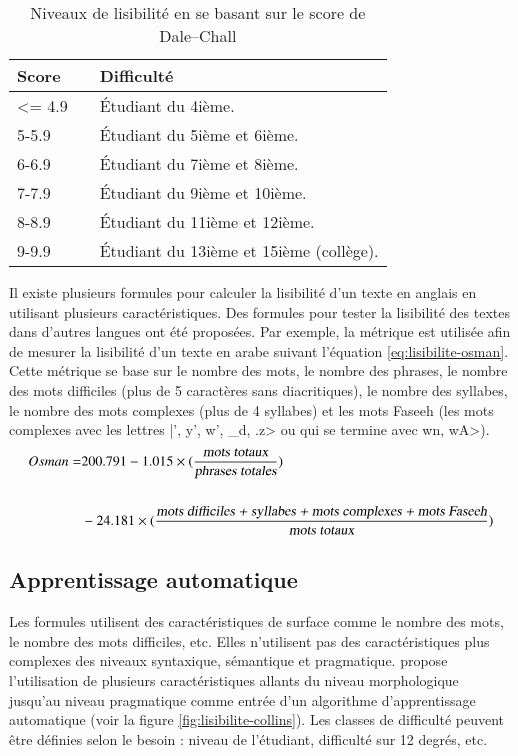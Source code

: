 \documentclass{KodeBook}
\begin{document}
\begin{table}[!ht]
	\centering
	\begin{tabular}{p{}lp{}}
		\hline\hline
		\textbf{Score} && \textbf{Difficulté}\\
		\hline
		\textless= 4.9 && Étudiant du 4ième. \\
		5-5.9 && Étudiant du 5ième et 6ième. \\
		6-6.9 && Étudiant du 7ième et 8ième.\\
		7-7.9 && Étudiant du 9ième et 10ième. \\
		8-8.9 && Étudiant du 11ième et 12ième. \\
		9-9.9 && Étudiant du 13ième et 15ième (collège). \\
		\hline\hline
	\end{tabular}
	\caption{Niveaux de lisibilité en se basant sur le score de Dale–Chall}
	\label{tab:lisibilite-dale-chall}
\end{table}

Il existe plusieurs formules pour calculer la lisibilité d'un texte en anglais en utilisant plusieurs caractéristiques. 
Des formules pour tester la lisibilité des textes dans d'autres langues ont été proposées. 
Par exemple, la métrique  \cite{2016-elhaj-rayson} est utilisée afin de mesurer la lisibilité d'un texte en arabe suivant l'équation \ref{eq:lisibilite-osman}.
Cette métrique se base sur le nombre des mots, le nombre des phrases, le nombre des mots difficiles (plus de 5 caractères sans diacritiques), le nombre des syllabes, le nombre des mots complexes (plus de 4 syllabes) et les mots Faseeh (les mots complexes avec les lettres \<|', y', w', _d, .z> ou qui se termine avec \<wn, wA>).
\begin{align}
Osman = & 200.791 - 1.015 \times (\frac{\text{\slshape mots totaux}}{\text{\slshape phrases totales}}) \nonumber\\
& \nonumber\\
& - 24.181 \times (\frac{\text{\slshape mots difficiles + syllabes + mots complexes + mots Faseeh}}{\text{\slshape mots totaux}}) \label{eq:lisibilite-osman}
\end{align}


\subsection{Apprentissage automatique}

Les formules utilisent des caractéristiques de surface comme le nombre des mots, le nombre des mots difficiles, etc.
Elles n'utilisent pas des caractéristiques plus complexes des niveaux syntaxique, sémantique et pragmatique. 
\citet{2014-collins} propose l'utilisation de plusieurs caractéristiques allants du niveau morphologique jusqu'au niveau pragmatique comme entrée d'un algorithme d'apprentissage automatique (voir la figure \ref{fig:lisibilite-collins}).
Les classes de difficulté peuvent être définies selon le besoin : niveau de l'étudiant, difficulté sur 12 degrés, etc.
\end{document}
